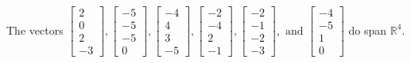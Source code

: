\begin{exercise}
\begin{exerciseStatement}
  \end{exerciseStatement}
  \begin{exerciseAnswer}
   The vectors \(\left[\begin{array}{r}
2 \\
0 \\
2 \\
-3
\end{array}\right] , \left[\begin{array}{r}
-5 \\
-5 \\
-5 \\
0
\end{array}\right] , \left[\begin{array}{r}
-4 \\
4 \\
3 \\
-5
\end{array}\right] , \left[\begin{array}{r}
-2 \\
-4 \\
2 \\
-1
\end{array}\right] , \left[\begin{array}{r}
-2 \\
-1 \\
-2 \\
-3
\end{array}\right] , \text{ and } \left[\begin{array}{r}
-4 \\
-5 \\
1 \\
0
\end{array}\right]\) 
  	 do  
	span \(\mathbb{R}^4\).
  


  \end{exerciseAnswer}
\end{exercise}